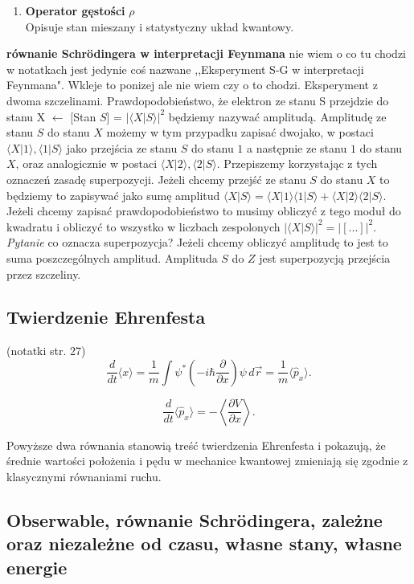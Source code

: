 \begin{itemize}
\begin{itemize}
\begin{enumerate}
  \item \textbf{Operator gęstości} \(\rho\) \\
    Opisuje stan mieszany i statystyczny układ kwantowy.
\end{enumerate}
\textbf{ równanie Schrödingera w interpretacji Feynmana}
nie wiem o co tu chodzi w notatkach jest jedynie coś nazwane ,,Eksperyment S-G w interpretacji Feynmana". Wkleje to ponizej ale nie wiem czy o to chodzi. 
Eksperyment z dwoma szczelinami.
Prawdopodobieństwo, że elektron ze stanu S przejdzie do stanu X \newline [Stan $X$] $\leftarrow$ [Stan $S$] = $\vert\langle X\vert S\rangle\vert^2$ będziemy nazywać amplitudą.
Amplitudę ze stanu $S$ do stanu $X$ możemy w tym przypadku zapisać dwojako, w postaci $\langle X\vert1\rangle, \langle 1\vert S\rangle$ jako przejścia ze stanu $S$ do stanu $1$ a następnie ze stanu $1$ do stanu $X$, oraz analogicznie w postaci $\langle X\vert2\rangle , \langle 2\vert S\rangle$. Przepiszemy korzystając z tych oznaczeń zasadę superpozycji. Jeżeli chcemy przejść ze stanu $S$ do stanu $X$ to będziemy to zapisywać jako sumę amplitud $\langle X\vert S\rangle = \langle X\vert1\rangle\langle 1\vert S\rangle + \langle X\vert2\rangle \langle 2\vert S\rangle$. Jeżeli chcemy zapisać prawdopodobieństwo to musimy obliczyć z tego moduł do kwadratu i obliczyć to wszystko w liczbach zespolonych $\vert\langle X\vert S\rangle \vert^2 = \vert[...]\vert^2$. 
\textit{Pytanie} co oznacza superpozycja? Jeżeli chcemy obliczyć amplitudę to jest to suma poszczególnych amplitud. Amplituda $S$ do $Z$ jest superpozycją przejścia przez szczeliny.
\subsection{Twierdzenie Ehrenfesta}
(notatki str. 27)
$$
\frac{d}{dt} \langle x \rangle = \frac{1}{m} \int \psi^* \left(-i\hbar \frac{\partial}{\partial x}\right) \psi \, d\vec{r} = \frac{1}{m} \langle \hat{p}_x \rangle.
$$

$$
\frac{d}{dt} \langle \hat{p}_x \rangle = - \left\langle \frac{\partial V}{\partial x} \right\rangle.
$$

Powyższe dwa równania stanowią treść twierdzenia Ehrenfesta i pokazują, że średnie wartości położenia i pędu w mechanice kwantowej zmieniają się zgodnie z klasycznymi równaniami ruchu. 


\subsection{Obserwable, równanie Schrödingera, zależne oraz niezależne od czasu, własne stany, własne energie}


\end{itemize}
\end{itemize}
